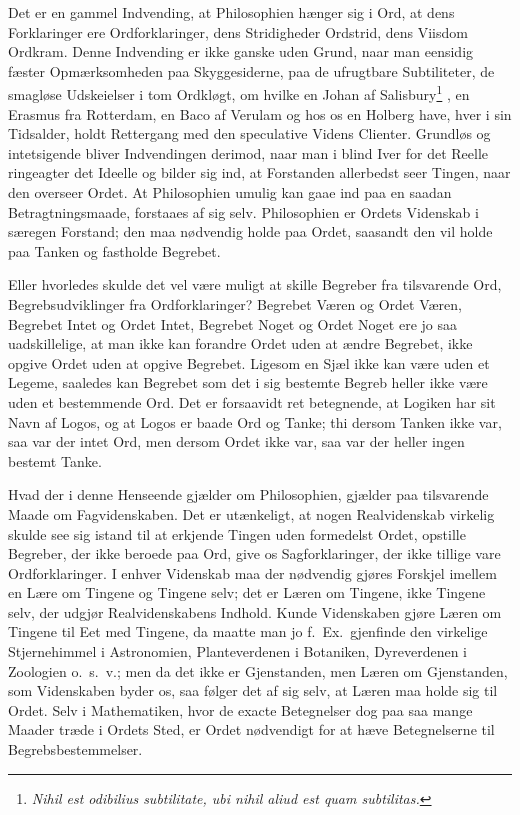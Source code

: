 \documentclass[12pt]{book}
\newcommand{\opage}[1]{\marginnote{\footnotesize\textit{[#1]}}}
\begin{document}
\opage{1}Det er en gammel Indvending, at Philosophien hænger sig i Ord, at dens Forklaringer ere Ordforklaringer, dens Stridigheder Ordstrid, dens Viisdom Ordkram. Denne Indvending er ikke ganske uden Grund, naar man eensidig fæster Opmærksomheden paa Skyggesiderne, paa de ufrugtbare Subtiliteter, de smagløse Udskeielser i tom Ordkløgt, om hvilke en Johan af Salisbury\footnote{\textit{Nihil est odibilius subtilitate, ubi nihil aliud est quam subtilitas.}}%
, en Erasmus fra Rotterdam, en Baco af Verulam og hos os en Holberg have, hver i sin Tidsalder, holdt Rettergang med den speculative Videns Clienter. Grundløs og intetsigende bliver Indvendingen derimod, naar man i blind Iver for det Reelle ringeagter det Ideelle og bilder sig ind, at Forstanden allerbedst seer Tingen, naar den overseer Ordet. At Philosophien umulig kan gaae ind paa en saadan Betragtningsmaade, forstaaes af sig selv. Philosophien er Ordets Videnskab i særegen Forstand; den maa nødvendig holde paa Ordet, saasandt den vil holde paa Tanken og fastholde Begrebet.

Eller hvorledes skulde det vel være muligt at skille Begreber fra tilsvarende Ord, Begrebsudviklinger fra Ordforklaringer? Begrebet Væren og Ordet Væren, Begrebet Intet og Ordet Intet, Begrebet Noget og Ordet Noget ere jo saa uadskillelige, at man ikke kan forandre Ordet uden at ændre Begrebet, ikke opgive Ordet uden at opgive Begrebet. Ligesom
\opage{2}en Sjæl ikke kan være uden et Legeme, saaledes kan Begrebet som det i sig bestemte Begreb heller ikke være uden et bestemmende Ord. Det er forsaavidt ret betegnende, at Logiken har sit Navn af Logos, og at Logos er baade Ord og Tanke; thi dersom Tanken ikke var, saa var der intet Ord, men dersom Ordet ikke var, saa var der heller ingen bestemt Tanke.

Hvad der i denne Henseende gjælder om Philosophien, gjælder paa tilsvarende Maade om Fagvidenskaben. Det er utænkeligt, at nogen Realvidenskab virkelig skulde see sig istand til at erkjende Tingen uden formedelst Ordet, opstille Begreber, der ikke beroede paa Ord, give os Sagforklaringer, der ikke tillige vare Ordforklaringer. I enhver Videnskab maa der nødvendig gjøres Forskjel imellem en Lære om Tingene og Tingene selv; det er Læren om Tingene, ikke Tingene selv, der udgjør Realvidenskabens Indhold. Kunde Videnskaben gjøre Læren om Tingene til Eet med Tingene, da maatte man jo f.\ Ex.\ gjenfinde den virkelige Stjernehimmel i Astronomien, Planteverdenen i Botaniken, Dyreverdenen i Zoologien o.\ s.\ v.; men da det ikke er Gjenstanden, men Læren om Gjenstanden, som Videnskaben byder os, saa følger det af sig selv, at Læren maa holde sig til Ordet. Selv i Mathematiken, hvor de exacte Betegnelser dog paa saa mange Maader træde i Ordets Sted, er Ordet nødvendigt for at hæve Betegnelserne til Begrebsbestemmelser.
\end{document}
